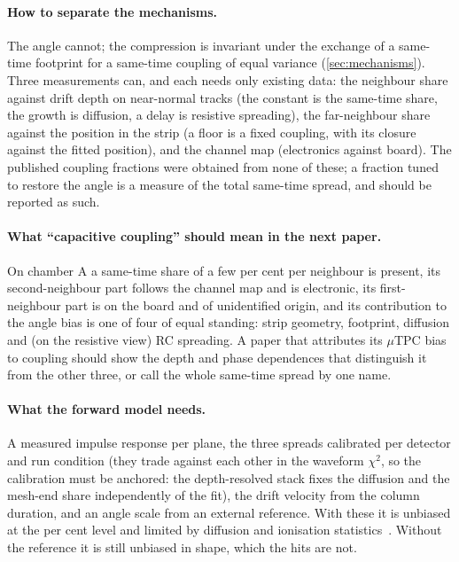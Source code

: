 \paragraph{How to separate the mechanisms.} The angle cannot; the compression is invariant under the exchange of a same-time
footprint for a same-time coupling of equal variance (\cref{sec:mechanisms}). Three measurements can, and each needs only
existing data: the neighbour share against drift depth on near-normal tracks (the constant is the same-time share, the growth is
diffusion, a delay is resistive spreading), the far-neighbour share against the position in the strip (a floor is a fixed
coupling, with its closure against the fitted position), and the channel map (electronics against board). The published
coupling fractions were obtained from none of these; a fraction tuned to restore the angle is a measure of the total same-time
spread, and should be reported as such.

\paragraph{What ``capacitive coupling'' should mean in the next paper.} On chamber A a same-time share of a few per cent per
neighbour is present, its second-neighbour part follows the channel map and is electronic, its first-neighbour part is on the
board and of unidentified origin, and its contribution to the angle bias is one of four of equal standing: strip geometry,
footprint, diffusion and (on the resistive view) RC spreading. A paper that attributes its $\mu$TPC bias to coupling should show
the depth and phase dependences that distinguish it from the other three, or call the whole same-time spread by one name.

\paragraph{What the forward model needs.} A measured impulse response per plane, the three spreads calibrated per detector and
run condition (they trade against each other in the waveform $\chi^2$, so the calibration must be anchored: the depth-resolved
stack fixes the diffusion and the mesh-end share independently of the fit), the drift velocity from the column duration, and
an angle scale from an external reference. With these it is unbiased at the per cent level and limited by diffusion and
ionisation statistics~\cite{paperII}. Without the reference it is still unbiased in shape, which the hits are not.
